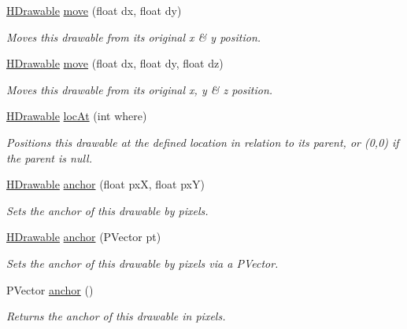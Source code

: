 \begin{DoxyCompactItemize}
\item 
\hyperlink{classhype_1_1drawable_1_1_h_drawable}{H\-Drawable} \hyperlink{classhype_1_1drawable_1_1_h_drawable_a0e5c5a9eb856155384d4b34a90cd38eb}{move} (float dx, float dy)
\begin{DoxyCompactList}\small\item\em Moves this drawable from its original x \& y position. \end{DoxyCompactList}\item 
\hyperlink{classhype_1_1drawable_1_1_h_drawable}{H\-Drawable} \hyperlink{classhype_1_1drawable_1_1_h_drawable_a11c1fec4c2f01bb4e86f42fd76800194}{move} (float dx, float dy, float dz)
\begin{DoxyCompactList}\small\item\em Moves this drawable from its original x, y \& z position. \end{DoxyCompactList}\item 
\hyperlink{classhype_1_1drawable_1_1_h_drawable}{H\-Drawable} \hyperlink{classhype_1_1drawable_1_1_h_drawable_a0ca3d835df3317d50723404b777d3a65}{loc\-At} (int where)
\begin{DoxyCompactList}\small\item\em Positions this drawable at the defined location in relation to its parent, or (0,0) if the parent is null. \end{DoxyCompactList}\item 
\hyperlink{classhype_1_1drawable_1_1_h_drawable}{H\-Drawable} \hyperlink{classhype_1_1drawable_1_1_h_drawable_a12df6048c645a3d076f5c6beda37820b}{anchor} (float px\-X, float px\-Y)
\begin{DoxyCompactList}\small\item\em Sets the anchor of this drawable by pixels. \end{DoxyCompactList}\item 
\hyperlink{classhype_1_1drawable_1_1_h_drawable}{H\-Drawable} \hyperlink{classhype_1_1drawable_1_1_h_drawable_a7e0b9a98e9920472ed92fd9c517a2299}{anchor} (P\-Vector pt)
\begin{DoxyCompactList}\small\item\em Sets the anchor of this drawable by pixels via a P\-Vector. \end{DoxyCompactList}\item 
P\-Vector \hyperlink{classhype_1_1drawable_1_1_h_drawable_a7ce0ca1f211ca11b7b69faa341a582b2}{anchor} ()
\begin{DoxyCompactList}\small\item\em Returns the anchor of this drawable in pixels. \end{DoxyCompactList}\item 

\end{DoxyCompactItemize}
